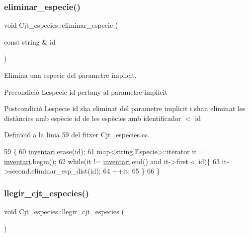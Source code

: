 \subsubsection{\texorpdfstring{eliminar\+\_\+especie()}{eliminar\_especie()}}
{\footnotesize\ttfamily void Cjt\+\_\+especies\+::eliminar\+\_\+especie (\begin{DoxyParamCaption}\item[{const string \&}]{id }\end{DoxyParamCaption})}



Elimina una especie del parametre implicit. 

\begin{DoxyPrecond}{Precondició}
L\textquotesingle{}especie id pertany al parametre implicit 
\end{DoxyPrecond}
\begin{DoxyPostcond}{Postcondició}
L\textquotesingle{}especie id s\textquotesingle{}ha eliminat del parametre implicit i s\textquotesingle{}han eliminat les distàncies amb espècie id de les espècies amb identificador $<$ id 
\end{DoxyPostcond}


Definició a la línia 59 del fitxer Cjt\+\_\+especies.\+cc.


\begin{DoxyCode}
59                                                    \{
60     \hyperlink{class_cjt__especies_aa253bc335c8c8176b8ece5c49a15c5f3}{inventari}.erase(\textcolor{keywordtype}{id});
61     map<string,Especie>::iterator it = \hyperlink{class_cjt__especies_aa253bc335c8c8176b8ece5c49a15c5f3}{inventari}.begin();
62     \textcolor{keywordflow}{while}(it != \hyperlink{class_cjt__especies_aa253bc335c8c8176b8ece5c49a15c5f3}{inventari}.end() and it->first < id)\{
63         it->second.eliminar\_esp\_dist(\textcolor{keywordtype}{id});
64         ++it;
65     \}
66 \}
\end{DoxyCode}
\mbox{\label{class_cjt__especies_a12bd759f16126d0e34b06ecf15575456}} 
\subsubsection{\texorpdfstring{llegir\+\_\+cjt\+\_\+especies()}{llegir\_cjt\_especies()}}
{\footnotesize\ttfamily void Cjt\+\_\+especies\+::llegir\+\_\+cjt\+\_\+especies (\begin{DoxyParamCaption}{ }\end{DoxyParamCaption})}



